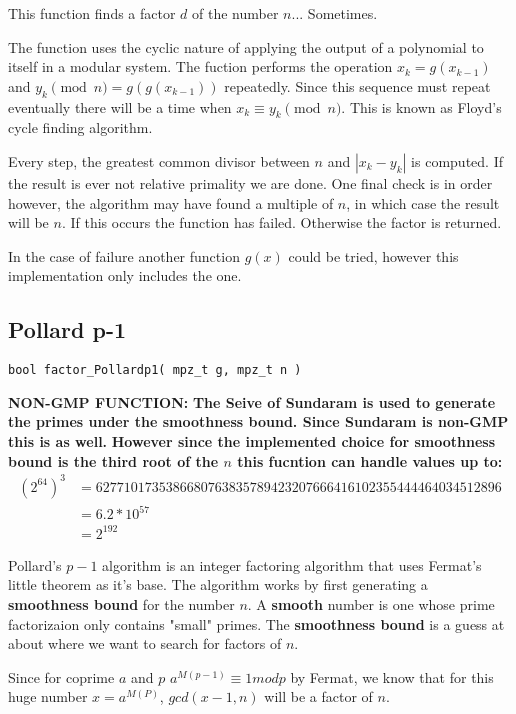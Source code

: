 This function finds a factor $d$ of the number $n$... Sometimes.

The function uses the cyclic nature of applying the output of a polynomial to itself in a modular system.
The fuction performs the operation $x_{k} = g(x_{k-1})$  and $y_{k} \pmod n  = g(g(x_{k-1}))$ repeatedly.
Since this sequence must repeat eventually there will be a time when $x_k \equiv y_k \pmod n$.
This is known as Floyd's cycle finding algorithm.

Every step, the greatest common divisor between $n$ and $|x_k-y_k|$ is computed. 
If the result is ever not relative primality we are done.
One final check is in order however, the algorithm may have found a multiple of $n$, in which case the result will be $n$.
If this occurs the function has failed.
Otherwise the factor is returned.

In the case of failure another function $g(x)$ could be tried, however this implementation only includes the one.


\subsection{Pollard p-1}
\begin{verbatim}
bool factor_Pollardp1( mpz_t g, mpz_t n )
\end{verbatim}
\textbf{ NON-GMP FUNCTION:}
\textbf{ The Seive of Sundaram is used to generate the primes under the smoothness bound. Since Sundaram is non-GMP this is as well.} 
{\bf However since the implemented choice for smoothness bound is the third root of the $n$ this fucntion can handle values up to:
\begin{align*}
(2^{64})^3 &= 6277101735386680763835789423207666416102355444464034512896 \\
&= 6.2 * 10^{57}\\
&= 2^{192} 
\end{align*}
}

Pollard's $p-1$ algorithm is an integer factoring algorithm that uses Fermat's little theorem as it's base.
The algorithm works by first generating a \textbf{smoothness bound} for the number $n$. 
A \textbf{smooth} number is one whose prime factorizaion only contains "small" primes.
The \textbf{smoothness bound} is a guess at about where we want to search for factors of $n$.

Since for coprime $a$ and $p$ $a^{M(p-1)} \equiv 1 mod p$ by Fermat, we know that for this huge number $x = a^{M(P)}$, $gcd(x-1, n)$ will be a factor of $n$.


